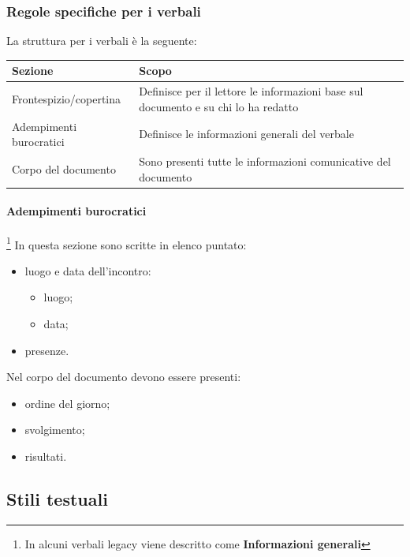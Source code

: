 \subsubsection{Regole specifiche per i verbali}

La struttura per i verbali è la seguente:

\begin{center}
    \begin{tabularx}{\linewidth}{l | X }            
        \textbf{Sezione} & \textbf{Scopo}\\
        \hline
        Frontespizio/copertina & Definisce per il lettore le informazioni base sul documento e su chi lo ha redatto\\
        Adempimenti burocratici & Definisce le informazioni generali del verbale\\
        Corpo del documento & Sono presenti tutte le informazioni comunicative del documento\\
    \end{tabularx}
\end{center}

\paragraph{Adempimenti burocratici}\footnote{In alcuni verbali legacy viene descritto come \textbf{Informazioni generali}} In questa sezione sono scritte in elenco puntato:

\begin{itemize}
    \item luogo e data dell'incontro:
	\begin{itemize}
		\item luogo;
		\item data;
	\end{itemize}
	\item presenze.
\end{itemize}

Nel corpo del documento devono essere presenti:

\begin{itemize}
    \item ordine del giorno;
    \item svolgimento;
    \item risultati.
\end{itemize}


\subsection{Stili testuali}

